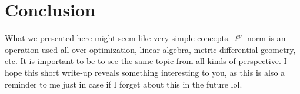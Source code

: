 \documentclass[11pt]{article}
\begin{document}
\section{Conclusion}
	What we presented here might seem like very simple concepts. $\ell^{p}$-norm is an operation used all over optimization, 
	linear algebra, metric differential geometry, etc. It is important to be to see the same topic from all kinds of perspective. 
	I hope this short write-up reveals something interesting to you, as this is also a reminder to me just in case if I forget about 
	this in the future lol. 
\end{document}
